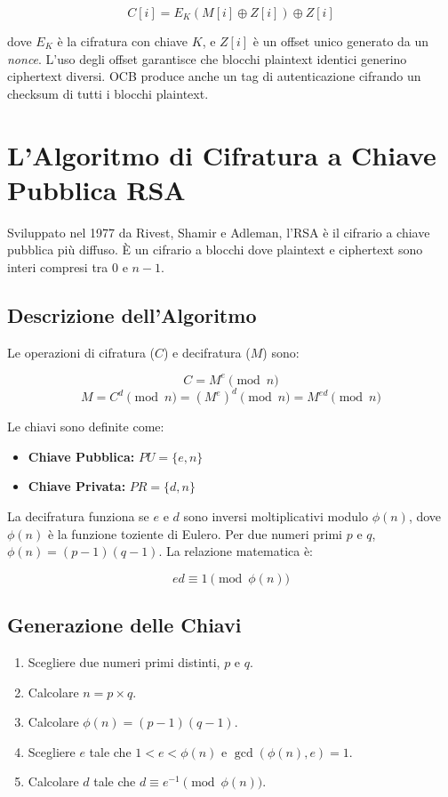 $$C[i] = E_K(M[i] \oplus Z[i]) \oplus Z[i]$$

dove $E_K$ è la cifratura con chiave $K$, e $Z[i]$ è un offset unico generato da un \textit{nonce}. L'uso degli offset garantisce che blocchi plaintext identici generino ciphertext diversi. OCB produce anche un tag di autenticazione cifrando un checksum di tutti i blocchi plaintext.

\section{L'Algoritmo di Cifratura a Chiave Pubblica RSA}

Sviluppato nel 1977 da Rivest, Shamir e Adleman, l'RSA è il cifrario a chiave pubblica più diffuso. È un cifrario a blocchi dove plaintext e ciphertext sono interi compresi tra $0$ e $n-1$.

\subsection{Descrizione dell'Algoritmo}
Le operazioni di cifratura ($C$) e decifratura ($M$) sono:

$$C = M^e \pmod{n}$$
$$M = C^d \pmod{n} = (M^e)^d \pmod{n} = M^{ed} \pmod{n}$$

Le chiavi sono definite come:
\begin{itemize}
    \item \textbf{Chiave Pubblica:} $PU = \{e, n\}$
    \item \textbf{Chiave Privata:} $PR = \{d, n\}$
\end{itemize}

La decifratura funziona se $e$ e $d$ sono inversi moltiplicativi modulo $\phi(n)$, dove $\phi(n)$ è la funzione toziente di Eulero. Per due numeri primi $p$ e $q$, $\phi(n) = (p-1)(q-1)$. La relazione matematica è:

$$ed \equiv 1 \pmod{\phi(n)}$$

\subsection{Generazione delle Chiavi}
\begin{enumerate}
    \item Scegliere due numeri primi distinti, $p$ e $q$.
    \item Calcolare $n = p \times q$.
    \item Calcolare $\phi(n) = (p-1)(q-1)$.
    \item Scegliere $e$ tale che $1 < e < \phi(n)$ e $\gcd(\phi(n), e) = 1$.
    \item Calcolare $d$ tale che $d \equiv e^{-1} \pmod{\phi(n)}$.
\end{enumerate}

